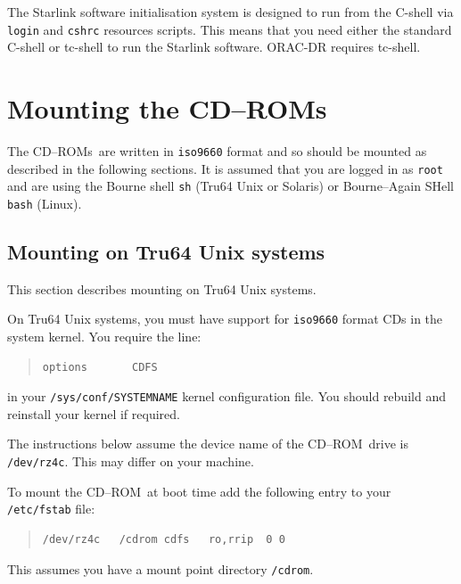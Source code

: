 \documentclass[twoside,11pt]{article}
\newcommand{\xlabel}[1]{}
\renewcommand{\_}{\texttt{\symbol{95}}}
\newcommand{\cdrom}{CD--ROM}
\newcommand{\cdrom}{CD-ROM}
\newcommand{\cdroms}{CD--ROMs}
\newcommand{\cdroms}{CD-ROMs}
\begin{document}
The Starlink software initialisation system is designed to run from the
C-shell via \texttt{login} and \texttt{cshrc} resources scripts.  This means
that you need either the standard C-shell or tc-shell to run the
Starlink software.  ORAC-DR requires tc-shell.

\newpage
\section{\xlabel{mounting_the_cdroms}Mounting the \cdroms}
\label{mounting_the_cdroms}
 
The \cdroms\ are written in \texttt{iso9660} format and so should be
mounted as described in the following sections.  It is assumed that you
are logged in as \texttt{root} and are using the Bourne shell
\texttt{sh} (Tru64 Unix or Solaris) or Bourne--Again SHell
\texttt{bash} (Linux).

\subsection{\xlabel{mounting_on_alpha}Mounting on Tru64 Unix systems}
\label{mounting_on_alpha}

This section describes mounting on Tru64 Unix systems.

On Tru64 Unix systems, you must have support for \texttt{iso9660} format CDs
in the system kernel.  You require the line:

\begin{quote}
\begin{verbatim}
options       CDFS
\end{verbatim}
\end{quote}

in your \texttt{/sys/conf/SYSTEM\_NAME} kernel configuration file.  You should
rebuild and reinstall your kernel if required.

The instructions below assume the device name of the \cdrom\ drive is 
\texttt{/dev/rz4c}.  This may differ on your machine.

To mount the \cdrom\ at boot time add the following entry to your
\texttt{/etc/fstab} file:

\begin{quote}
\begin{verbatim}
/dev/rz4c   /cdrom cdfs   ro,rrip  0 0
\end{verbatim}
\end{quote}

This assumes you have a mount point directory \texttt{/cdrom}.
\end{document}
